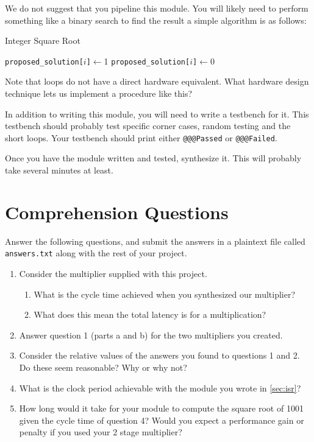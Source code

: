 \documentclass{article}
\begin{document}
We do not suggest that you pipeline this module. You will likely need to
perform something like a binary search to find the result a simple algorithm is
as follows:
\begin{algorithm}[H]
	\caption{Integer Square Root}
	\begin{algorithmic}[1]
			\State \texttt{proposed\_solution[$i$]}$\leftarrow$1
			\State \texttt{proposed\_solution[$i$]}$\leftarrow$0
			\EndIf
		\EndFor
		\EndProcedure
	\end{algorithmic}
\end{algorithm}

Note that loops do not have a direct hardware equivalent. What hardware design
technique lets us implement a procedure like this?

In addition to writing this module, you will need to write a testbench for it.
This testbench should probably test specific corner cases, random testing and
the short loops. Your testbench should print either \texttt{@@@Passed} or
\texttt{@@@Failed}. 

Once you have the module written and tested, synthesize it. This will probably 
take several minutes at least.

\section{Comprehension Questions}

Answer the following questions, and submit the answers in a plaintext file called
\texttt{answers.txt} along with the rest of your project.

\begin{enumerate}
	\item Consider the multiplier supplied with this project.
		\begin{enumerate}
			\item What is the cycle time achieved when you synthesized our 
				multiplier? 
			\item What does this mean the total latency is for a multiplication?
		\end{enumerate}
	\item Answer question 1 (parts a and b) for the two multipliers you created.
	\item Consider the relative values of the answers you found to questions 1
		and 2. Do these seem reasonable? Why or why not?
	\item What is the clock period achievable with the module you wrote in
		\cref{sec:isr}?
	\item How long would it take for your module to compute the square root of 
		1001 given the cycle time of question 4? Would you expect a performance 
		gain or penalty if you used your 2 stage multiplier?
\end{enumerate}
\end{document}

